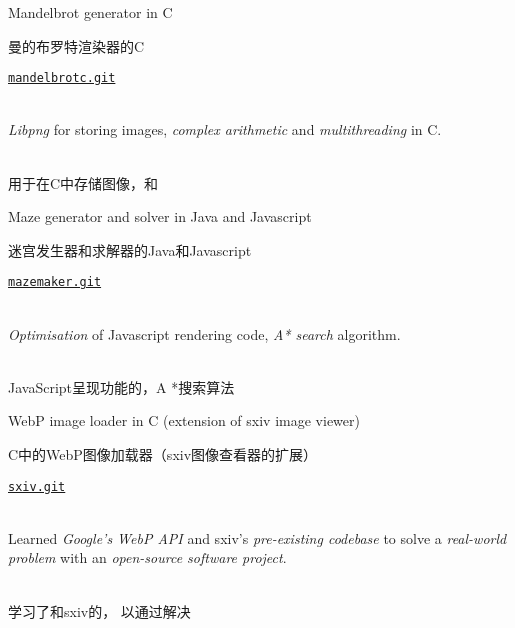         \begin{itemize}
\begin{xen}
            \item Mandelbrot generator in C
\end{xen}
\begin{xcn}
            \item 曼的布罗特渲染器的C
\end{xcn}
                \hfill
                \href{https://github.com/Ytrewq13/mandelbrotc.git}{\texttt{mandelbrotc.git}}
\begin{xen}
    \\ \emph{Libpng} for storing images, \emph{complex arithmetic} and
    \emph{multithreading} in C.
\end{xen}
\begin{xcn}
    \\ 用于在C中存储图像，和
\end{xcn}
\begin{xen}
            \item Maze generator and solver in Java and Javascript
\end{xen}
\begin{xcn}
            \item 迷宫发生器和求解器的Java和Javascript
\end{xcn}
                \hfill
                \href{https://github.com/Ytrewq13/mazemaker.git}{\texttt{mazemaker.git}}
\begin{xen}
    \\ \emph{Optimisation} of Javascript rendering code, \emph{A* search}
    algorithm.
\end{xen}
\begin{xcn}
    \\ JavaScript呈现功能的，A *搜索算法
\end{xcn}
\begin{xen}
            \item WebP image loader in C (extension of sxiv image viewer)
\end{xen}
\begin{xcn}
            \item C中的WebP图像加载器（sxiv图像查看器的扩展）
\end{xcn}
                \hfill
                \href{https://github.com/Ytrewq13/sxiv.git}{\texttt{sxiv.git}}
\begin{xen}
    \\ Learned \emph{Google's WebP API} and sxiv's \emph{pre-existing codebase}
    to solve a \emph{real-world problem} with an \emph{open-source software
    project}.
\end{xen}
\begin{xcn}
    \\ 学习了和sxiv的，
    以通过解决
\end{xcn}
        \end{itemize}
